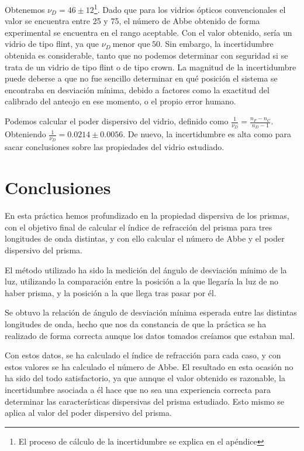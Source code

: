 \documentclass[10pt,onecolumn]{article}
\begin{document}
Obtenemos $\nu_D=46\pm12$\footnote{El proceso de cálculo de la incertidumbre se explica en el apéndice}. 
Dado que para los vidrios ópticos convencionales el valor se encuentra entre 25 y 75,
el número de Abbe obtenido de forma experimental 
se encuentra en el rango aceptable. Con el valor obtenido, sería un vidrio de tipo flint, ya que $\nu_D\ \text{menor que}\ 50$.
Sin embargo, la incertidumbre obtenida es considerable, tanto que no podemos determinar con seguridad si
se trata de un vidrio de tipo flint o de tipo crown.
La magnitud de la incertidumbre puede deberse a que no fue sencillo determinar en qué posición el sistema 
se encontraba en desviación mínima, debido a factores como la exactitud del calibrado del anteojo en ese 
momento, o el propio error humano.


Podemos calcular el poder dispersivo del vidrio, definido como $\frac{1}{\nu_D} = \frac{n_F - n_C}{n_D - 1}$. 
Obteniendo $\frac{1}{\nu_D}=0.0214\pm 0.0056$. De nuevo, la incertidumbre es alta como para 
sacar conclusiones sobre las propiedades del vidrio estudiado.

\section{Conclusiones}
En esta práctica hemos profundizado en la propiedad dispersiva de los prismas, con el objetivo 
final de calcular el índice de refracción del prisma para tres longitudes de onda distintas, 
y con ello calcular el número de Abbe y el poder dispersivo del prisma.

El método utilizado ha sido la medición del ángulo de desviación mínimo de la luz, 
utilizando la comparación entre la posición a la que llegaría la luz de no haber prisma, 
y la posición a la que llega tras pasar por él.

Se obtuvo la relación de ángulo de desviación mínima esperada entre las distintas longitudes de onda, hecho que nos da constancia de que la práctica se ha realizado de forma correcta aunque los datos tomados creíamos que estaban mal.

Con estos datos, se ha calculado el índice de refracción para cada caso, y con estos valores se ha calculado 
el número de Abbe. El resultado en esta ocasión no ha sido del todo satisfactorio, ya que aunque el 
valor obtenido es razonable, la incertidumbre asociada a él hace que no sea una experiencia correcta 
para determinar las características dispersivas del prisma estudiado. Esto mismo se aplica al valor del 
poder dispersivo del prisma.
\end{document}
